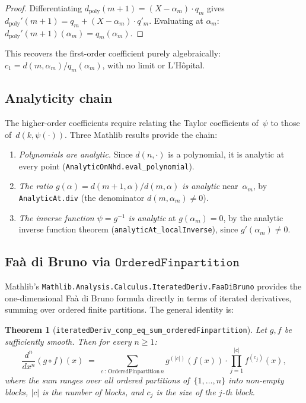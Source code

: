 \documentclass[11pt,a4paper]{article}
\theoremstyle{plain}
\newtheorem{theorem}{Theorem}[section]
\theoremstyle{definition}
\newcommand{\alpham}{\alpha_m}
\newcommand{\lean}[1]{\texttt{#1}}
\begin{document}
\begin{proof}
Differentiating $d_{\mathrm{poly}}(m{+}1) = (X - \alpham) \cdot q_m$
gives $d_{\mathrm{poly}}'(m{+}1) = q_m + (X - \alpham) \cdot q'_m$.
Evaluating at $\alpham$: $d_{\mathrm{poly}}'(m{+}1)(\alpham) = q_m(\alpham)$.
\end{proof}

This recovers the first-order coefficient purely algebraically:
$c_1 = d(m,\alpham)/q_m(\alpham)$, with no limit or L'H\^opital.

\subsection{Analyticity chain}

The higher-order coefficients require relating the Taylor
coefficients of~$\psi$ to those of~$d(k, \psi(\cdot))$.
Three Mathlib results provide the chain:

\begin{enumerate}[label=(\arabic*)]
  \item \emph{Polynomials are analytic.}
    Since $d(n, \cdot)$ is a polynomial, it is analytic at every
    point (\lean{AnalyticOnNhd.eval\_polynomial}).
  \item \emph{The ratio $g(\alpha) = d(m{+}1,\alpha)/d(m,\alpha)$ is analytic}
    near~$\alpham$, by \lean{AnalyticAt.div} (the denominator
    $d(m, \alpham) \ne 0$).
  \item \emph{The inverse function $\psi = g^{-1}$ is analytic} at
    $g(\alpham) = 0$, by the analytic inverse function theorem
    (\lean{analyticAt\_localInverse}), since $g'(\alpham) \ne 0$.
\end{enumerate}

\subsection{Fa\`a di Bruno via \texorpdfstring{$\texttt{OrderedFinpartition}$}{OrderedFinpartition}}
\label{sec:fdb}

Mathlib's \lean{Mathlib.Analysis.Calculus.IteratedDeriv.FaaDiBruno}
provides the one-dimensional Fa\`a di Bruno formula directly in
terms of iterated derivatives, summing over ordered finite
partitions.  The general identity is:

\begin{theorem}[\lean{iteratedDeriv\_comp\_eq\_sum\_orderedFinpartition}]
\label{thm:fdb-general}
Let $g, f$ be sufficiently smooth.  Then for every $n \ge 1$:
\[
  \frac{d^n}{dx^n}(g \circ f)(x)
  \;=\; \sum_{c \,:\, \mathrm{OrderedFinpartition}\,n}
  g^{(|c|)}(f(x)) \cdot \prod_{j=1}^{|c|} f^{(c_j)}(x),
\]
where the sum ranges over all ordered partitions of~$\{1,\ldots,n\}$
into non-empty blocks, $|c|$ is the number of blocks, and
$c_j$ is the size of the $j$-th block.
\end{theorem}
\end{document}
